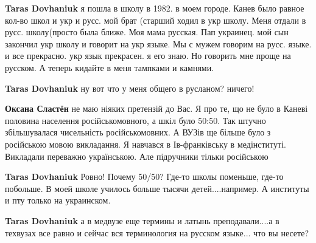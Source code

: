 \begin{itemize}
\begin{itemize}
\textbf{Taras Dovhaniuk} я пошла в школу в 1982. в моем городе. Канев было
равное кол-во школ и укр и русс. мой брат (старший ходил в укр школу. Меня
отдали в русс. школу(просто была ближе. Моя мама русская. Пап украинец. мой сын
закончил укр школу и говорит на укр языке. Мы с мужем говорим на русс. языке. и
все прекрасно. укр язык прекрасен. я его знаю. Но говорить мне проще на
русском. А теперь кидайте в меня тампками и камнями.

 
\textbf{Taras Dovhaniuk} ну вот что у меня общего в русланом? ничего!

 
\textbf{Оксана Сластён} не маю ніяких претензій до Вас. Я про те, що не було в
Каневі половина населення російськомовного, а шкіл було 50:50. Так штучно
збільшувалася чисельність російськомовних. А ВУЗів ще більше було з російською
мовою викладання. Я навчався в Ів-франківську в медінституті. Викладали
переважно українською. Але підручники тільки російською

 
\textbf{Taras Dovhaniuk} Ровно! Почему 50/50? Где-то школы поменьше, где-то
побольше. В моей школе училось больше тысячи детей....например. А институты и
пту только на украинском.

 
\textbf{Taras Dovhaniuk} а в медвузе еще термины и латынь преподавали....а в
техвузах все равно и сейчас вся терминология на русском языке... что вы несете?


\end{itemize}
\end{itemize}
